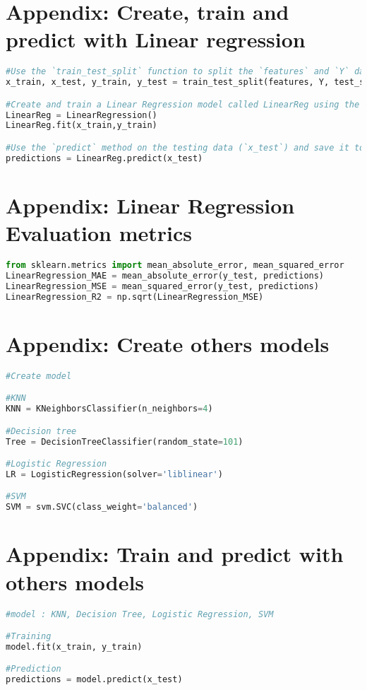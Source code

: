 \documentclass[12pt]{article}
\begin{document}
\section{Appendix: Create, train and predict with Linear regression}
\begin{lstlisting}[language=Python]
#Use the `train_test_split` function to split the `features` and `Y` dataframes with a `test_size` of `0.2` and the `random_state` set to `10`
x_train, x_test, y_train, y_test = train_test_split(features, Y, test_size=0.2, random_state=10)

#Create and train a Linear Regression model called LinearReg using the training data (`x_train`, `y_train`).
LinearReg = LinearRegression()
LinearReg.fit(x_train,y_train)

#Use the `predict` method on the testing data (`x_test`) and save it to the array `predictions`.
predictions = LinearReg.predict(x_test)
\end{lstlisting}

\section{Appendix: Linear Regression Evaluation metrics}
\label{appendix:LinearReg}
\begin{lstlisting}[language=Python]
from sklearn.metrics import mean_absolute_error, mean_squared_error
LinearRegression_MAE = mean_absolute_error(y_test, predictions)
LinearRegression_MSE = mean_squared_error(y_test, predictions)
LinearRegression_R2 = np.sqrt(LinearRegression_MSE)
\end{lstlisting}

\section{Appendix: Create others models}
\begin{lstlisting}[language=Python]
#Create model 

#KNN
KNN = KNeighborsClassifier(n_neighbors=4)

#Decision tree
Tree = DecisionTreeClassifier(random_state=101)

#Logistic Regression
LR = LogisticRegression(solver='liblinear')

#SVM
SVM = svm.SVC(class_weight='balanced')

\end{lstlisting}


\section{Appendix: Train and predict with others models}
\begin{lstlisting}[language=Python]
#model : KNN, Decision Tree, Logistic Regression, SVM

#Training
model.fit(x_train, y_train)

#Prediction
predictions = model.predict(x_test)
\end{lstlisting}
\newpage
\end{document}
